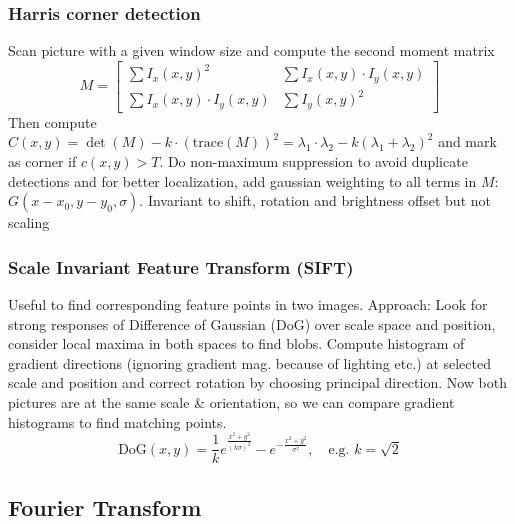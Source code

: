 \documentclass[a4paper,10pt]{article}
\begin{document}
\subsubsection{Harris corner detection} Scan picture with a given window size and compute the second moment matrix \[ M = \left[\begin{smallmatrix}\sum I_x(x,y)^2 & \sum I_x(x,y)\cdot I_y(x,y) \\ \sum I_x(x,y)\cdot I_y(x,y) & \sum I_y(x,y)^2 \end{smallmatrix}\right] \] Then compute \( C(x,y) = \det(M) - k\cdot (\text{trace}(M))^2 = \lambda_1 \cdot \lambda_2 - k(\lambda_1 + \lambda_2)^2 \) and mark as corner if \( c(x,y) > T \). Do non-maximum suppression to avoid duplicate detections and for better localization, add gaussian weighting to all terms in \( M \): \( G(x-x_0, y-y_0, \sigma) \). Invariant to shift, rotation and brightness offset but not scaling
\subsubsection{Scale Invariant Feature Transform (SIFT)} Useful to find corresponding feature points in two images. Approach: Look for strong responses of Difference of Gaussian (DoG) over scale space and position, consider local maxima in both spaces to find blobs. Compute histogram of gradient directions (ignoring gradient mag. because of lighting etc.) at selected scale and position and correct rotation by choosing principal direction. Now both pictures are at the same scale \& orientation, so we can compare gradient histograms to find matching points. \[
	\text{DoG}(x,y) = \frac{1}{k} e^{\frac{x^2+y^2}{(k\sigma)^2}} - e^{-\frac{x^2+y^2}{\sigma ^2}}, \quad \text{e.g. } k=\sqrt{2} 
\] 

\subsection{Fourier Transform}
\end{document}
